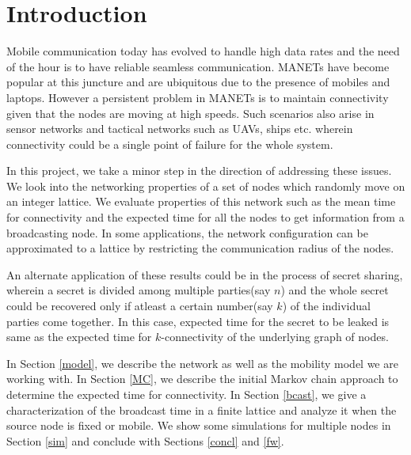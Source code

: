 \documentclass[a4paper,10pt,english]{article}
\begin{document}
\section{Introduction}
\par Mobile communication today has evolved to handle high data rates and the need of the hour is to have reliable seamless communication. MANETs have become popular at this juncture and are ubiquitous due to the presence of mobiles and laptops. However a persistent problem in MANETs is to maintain connectivity given that the nodes are moving at high speeds. Such scenarios also arise in sensor networks and tactical networks such as UAVs, ships etc. wherein connectivity could be a single point of failure for the whole system.
\par In this project, we take a minor step in the direction of addressing these issues. We look into the networking properties of a set of nodes which randomly move on an integer lattice. We evaluate properties of this network such as the mean time for connectivity and the expected time for all the nodes to get information from a broadcasting node. In some applications, the network configuration can be approximated to a lattice by restricting the communication radius of the nodes.
\par An alternate application of these results could be in the process of secret sharing, wherein a secret is divided among multiple parties(say $n$) and the whole secret could be recovered only if atleast a certain number(say $k$) of the individual parties come together. In this case, expected time for the secret to be leaked is same as the expected time for $k$-connectivity of the underlying graph of nodes.
\par In Section \ref{model}, we describe the network as well as the mobility model we are working with. In Section \ref{MC}, we describe the initial Markov chain approach to determine the expected time for connectivity. In Section \ref{bcast}, we give a characterization of the broadcast time in a finite lattice and analyze it when the source node is fixed or mobile. We show some simulations for multiple nodes in Section \ref{sim} and conclude with Sections \ref{concl} and \ref{fw}.
\end{document}
